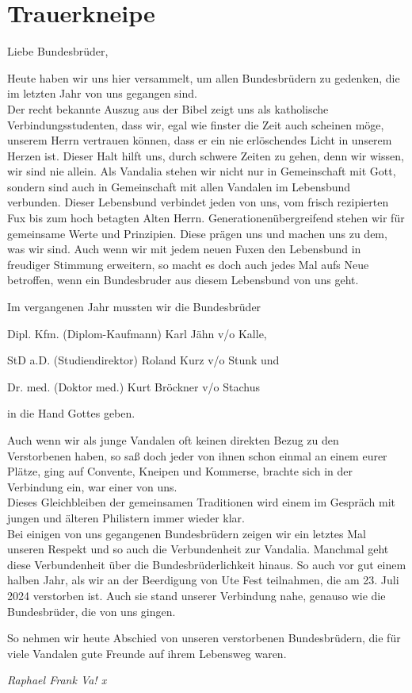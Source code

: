 \section{Trauerkneipe}



Liebe Bundesbrüder,
\begin{multicols}{2}
Heute haben wir uns hier versammelt, um allen Bundesbrüdern zu gedenken,
die im letzten Jahr von uns gegangen sind.\\
Der recht bekannte Auszug aus der Bibel zeigt uns als katholische
Verbindungsstudenten, dass wir, egal wie finster die Zeit auch scheinen möge,
unserem Herrn vertrauen können, dass er ein nie erlöschendes Licht in unserem
Herzen ist. Dieser Halt hilft uns, durch schwere Zeiten zu gehen, denn wir
wissen, wir sind nie allein. Als Vandalia stehen wir nicht nur in Gemeinschaft
mit Gott, sondern sind auch in Gemeinschaft mit allen Vandalen im Lebensbund
verbunden. Dieser Lebensbund verbindet jeden von uns, vom frisch rezipierten
Fux bis zum hoch betagten Alten Herrn. Generationenübergreifend stehen wir für
gemeinsame Werte und Prinzipien. Diese prägen uns und machen uns zu dem, was
wir sind. Auch wenn wir mit jedem neuen Fuxen den Lebensbund in freudiger
Stimmung erweitern, so macht es doch auch jedes Mal aufs Neue betroffen, wenn
ein Bundesbruder aus diesem Lebensbund von uns geht.

Im vergangenen Jahr mussten wir die Bundesbrüder

Dipl. Kfm. (Diplom-Kaufmann) Karl Jähn v/o Kalle,

StD a.D. (Studiendirektor) Roland Kurz v/o Stunk und

Dr. med. (Doktor med.) Kurt Bröckner v/o Stachus

in die Hand Gottes geben.

Auch wenn wir als junge Vandalen oft keinen direkten Bezug zu den
Verstorbenen haben, so saß doch jeder von ihnen schon einmal an einem eurer
Plätze, ging auf Convente, Kneipen und Kommerse, brachte sich in der Verbindung
ein, war einer von uns.\\
Dieses Gleichbleiben der gemeinsamen Traditionen wird einem im Gespräch mit
jungen und älteren Philistern immer wieder klar.\\
Bei einigen von uns gegangenen Bundesbrüdern zeigen wir ein letztes Mal
unseren Respekt und so auch die Verbundenheit zur Vandalia. Manchmal geht diese
Verbundenheit über die Bundesbrüderlichkeit hinaus. So auch vor gut einem
halben Jahr, als wir an der Beerdigung von Ute Fest teilnahmen, die am 23. Juli
2024 verstorben ist. Auch sie stand unserer Verbindung nahe, genauso wie die
Bundesbrüder, die von uns gingen.

So nehmen wir heute Abschied von unseren verstorbenen Bundesbrüdern, die
für viele Vandalen gute Freunde auf ihrem Lebensweg waren.

\end{multicols}

	\begin{flushright}
		\hfill\emph{Raphael Frank Va! x}
	\end{flushright}
